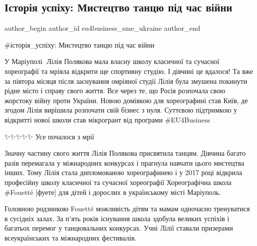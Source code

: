  
 
 
 
 

\subsection{Історія успіху: Мистецтво танцю під час війни}
\label{sec:16_03_2023.fb.eu4business_sme_ukraine.1.mystectvo_tancju_mariupol_vijna}

\ifcmt
 author_begin
   author_id eu4business_sme_ukraine
 author_end
\fi

\#історія\_успіху: Мистецтво танцю під час війни

У Маріуполі 💃Лілія Полякова мала власну школу класичної та сучасної
хореографії та мріяла відкрити ще спортивну студію. І дівчині це вдалося! Та
вже за півтора місяця після заснування омріяної студії Лілія була змушена
покинути рідне місто і справу свого життя. Все через те, що Росія розпочала
свою жорстоку війну проти України. Новою домівкою для хореографині став Київ,
де згодом Лілія вирішила розпочати свій бізнес з нуля. Суттєвою підтримкою у
відкритті нової школи став мікрогрант від програми \#EU4Business

✨✨✨✨✨ Усе почалося з мрії

Значну частину свого життя Лілія Полякова присвятила танцям. Дівчина багато
разів перемагала у міжнародних конкурсах і прагнула навчати цього мистецтва
інших. Тому Лілія стала дипломованою хореографинею і у 2017 році відкрила
професійну школу класичної та сучасної хореографії Хореографічна школа \#Fouetté
[фуете] для дітей і дорослих в українському місті Маріуполь.

Головною родзинкою Fouetté можливість дітям та мамам одночасно тренуватися в
сусідніх залах. За п’ять років існування школа здобула великих успіхів і
багатьох перемог у танцювальних конкурсах. Учні Лілії ставали призерами
всеукраїнських та міжнародних фестивалів. 

